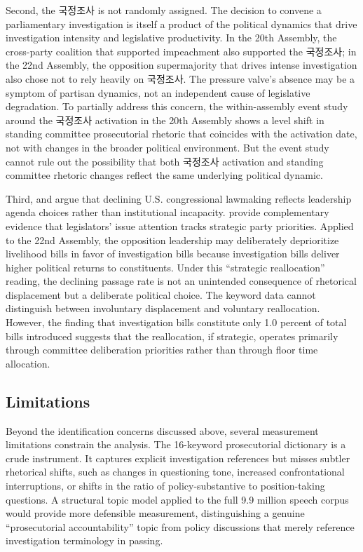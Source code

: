 \documentclass[11pt]{article}
\begin{document}
Second, the 국정조사 is not randomly assigned. The decision to convene a parliamentary investigation is itself a product of the political dynamics that drive investigation intensity and legislative productivity. In the 20th Assembly, the cross-party coalition that supported impeachment also supported the 국정조사; in the 22nd Assembly, the opposition supermajority that drives intense investigation also chose not to rely heavily on 국정조사. The pressure valve's absence may be a symptom of partisan dynamics, not an independent cause of legislative degradation. To partially address this concern, the within-assembly event study around the 국정조사 activation in the 20th Assembly shows a level shift in standing committee prosecutorial rhetoric that coincides with the activation date, not with changes in the broader political environment. But the event study cannot rule out the possibility that both 국정조사 activation and standing committee rhetoric changes reflect the same underlying political dynamic.

Third, \citet{lewallen2017} and \citet{curry2019} argue that declining U.S. congressional lawmaking reflects leadership agenda choices rather than institutional incapacity. \citet{barbera2019} provide complementary evidence that legislators' issue attention tracks strategic party priorities. Applied to the 22nd Assembly, the opposition leadership may deliberately deprioritize livelihood bills in favor of investigation bills because investigation bills deliver higher political returns to constituents. Under this ``strategic reallocation'' reading, the declining passage rate is not an unintended consequence of rhetorical displacement but a deliberate political choice. The keyword data cannot distinguish between involuntary displacement and voluntary reallocation. However, the finding that investigation bills constitute only 1.0 percent of total bills introduced suggests that the reallocation, if strategic, operates primarily through committee deliberation priorities rather than through floor time allocation.

\subsection{Limitations}

Beyond the identification concerns discussed above, several measurement limitations constrain the analysis. The 16-keyword prosecutorial dictionary is a crude instrument. It captures explicit investigation references but misses subtler rhetorical shifts, such as changes in questioning tone, increased confrontational interruptions, or shifts in the ratio of policy-substantive to position-taking questions. A structural topic model applied to the full 9.9 million speech corpus would provide more defensible measurement, distinguishing a genuine ``prosecutorial accountability'' topic from policy discussions that merely reference investigation terminology in passing.
\end{document}
